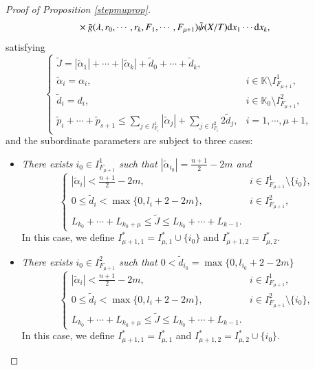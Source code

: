 \documentclass[11pt,reqno]{amsart}
\def\d{{\rm d}}
\numberwithin{equation}{section}
\theoremstyle{definition}
\begin{document}
\begin{proof}[Proof of Proposition \ref{stepmuprop}]
\begin{equation}
\begin{split}
			&\times\tilde{g}(\lambda,r_0,\cdots,r_k,F_1,\cdots,F_{\mu+1})\tilde{\psi}(X/T)\d x_1\cdots \d x_k,
		\end{split}
	\end{equation}
	satisfying
	\begin{equation}\label{tildeJconstraint}
		\begin{cases}
			\tilde{J}=|\tilde{\alpha}_1|+\cdots+|\tilde{\alpha}_k|+\tilde{d}_0+\cdots+\tilde{d}_k,\\
			\tilde{\alpha}_i=\alpha_i,\quad&i\in\mathbb{K}\setminus I_{F_{\mu+1}}^1,\\
			\tilde{d}_i=d_i,&i\in\mathbb{K}_0\setminus I_{F_{\mu+1}}^2,\\
			\tilde{p}_i+\cdots+\tilde{p}_{s+1}\leq\sum_{j\in I_{F_i}^1}|\tilde{\alpha}_j|+\sum_{j\in I_{F_i}^2}2\tilde{d}_j,&i=1,\cdots,\mu+1,
		\end{cases}
	\end{equation}
	and the subordinate parameters are subject to three cases:
	\begin{itemize}
		\item[\emph{Case 1'}] \textit{There exists $i_0\in I_{F_{\mu+1}}^1$ such that $|\tilde{\alpha}_{i_0}|=\frac{n+1}{2}-2m$ and}
		\begin{equation*}\label{dotJcase1}
			\begin{cases}
				|\tilde{\alpha}_i|<\frac{n+1}{2}-2m,\quad&i\in I_{F_{\mu+1}}^1\setminus\{i_0\},\\
				0\leq\tilde{d}_i<\max\{0,l_i+2-2m\},&i\in I_{F_{\mu+1}}^2,\\
				L_{k_0}+\cdots+L_{k_0+\mu}\leq\tilde{J}\leq L_{k_0}+\cdots+L_{k-1}.
			\end{cases}
		\end{equation*}
		In this case, we define $I_{\mu+1,1}^*=I_{\mu,1}^*\cup\{i_0\}$ and $I_{\mu+1,2}^*=I_{\mu,2}^*$.
		
		\item[\emph{Case 2'}] \textit{There exists $i_0\in I_{F_{\mu+1}}^2$ such that $0<\tilde{d}_{i_0}=\max\{0,l_{i_0}+2-2m\}$}
		\begin{equation*}\label{dotJcase2}
			\begin{cases}
				|\tilde{\alpha}_i|<\frac{n+1}{2}-2m,\quad&i\in I_{F_{\mu+1}}^1,\\
				0\leq\tilde{d}_i<\max\{0,l_i+2-2m\},&i\in I_{F_{\mu+1}}^2\setminus\{i_0\},\\
				L_{k_0}+\cdots+L_{k_0+\mu}\leq\tilde{J}\leq L_{k_0}+\cdots+L_{k-1}.
			\end{cases}
		\end{equation*}
		In this case, we define $I_{\mu+1,1}^*=I_{\mu,1}^*$ and $I_{\mu+1,2}^*=I_{\mu,2}^*\cup\{i_0\}$.
		

\end{itemize}
\end{proof}
\end{document}
